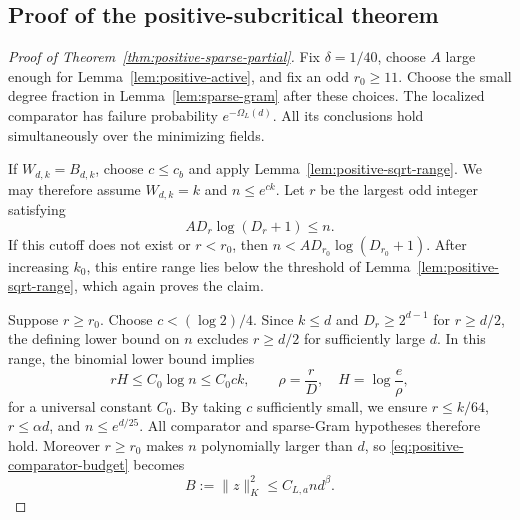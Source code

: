 \subsection{Proof of the positive-subcritical theorem}
\begin{proof}[Proof of Theorem~\ref{thm:positive-sparse-partial}]
Fix $\delta=1/40$, choose $A$ large enough for
Lemma~\ref{lem:positive-active}, and fix an odd $r_0\ge11$.
Choose the small degree fraction in
Lemma~\ref{lem:sparse-gram} after these choices.
The localized comparator has failure probability $e^{-\Omega_L(d)}$.
All its conclusions hold simultaneously over the minimizing fields.

If $W_{d,k}=B_{d,k}$, choose $c\le c_b$ and apply
Lemma~\ref{lem:positive-sqrt-range}. We may therefore assume
$W_{d,k}=k$ and $n\le e^{ck}$.
Let $r$ be the largest odd integer satisfying
\[
 A D_r\log(D_r+1)\le n.
\]
If this cutoff does not exist or $r<r_0$, then
$n<A D_{r_0}\log(D_{r_0}+1)$.
After increasing $k_0$, this entire range lies below the threshold of
Lemma~\ref{lem:positive-sqrt-range}, which again proves the claim.

Suppose $r\ge r_0$. Choose $c<(\log2)/4$.
Since $k\le d$ and $D_r\ge2^{d-1}$ for $r\ge d/2$, the defining
lower bound on $n$ excludes $r\ge d/2$ for sufficiently large $d$.
In this range, the binomial lower bound implies
\begin{equation}
 rH\le C_0\log n\le C_0 c k,
 \qquad \rho=\frac rD,\quad H=\log\frac e\rho,
 \label{eq:positive-main-cutoff}
\end{equation}
for a universal constant $C_0$.
By taking $c$ sufficiently small, we ensure $r\le k/64$,
$r\le\alpha d$, and $n\le e^{d/25}$.
All comparator and sparse-Gram hypotheses therefore hold.
Moreover $r\ge r_0$ makes $n$ polynomially larger than $d$, so
\eqref{eq:positive-comparator-budget} becomes
\begin{equation}
 B:=\|z\|_K^2\le C_{L,a}n d^\beta.
 \label{eq:positive-main-budget}
\end{equation}


\end{proof}
